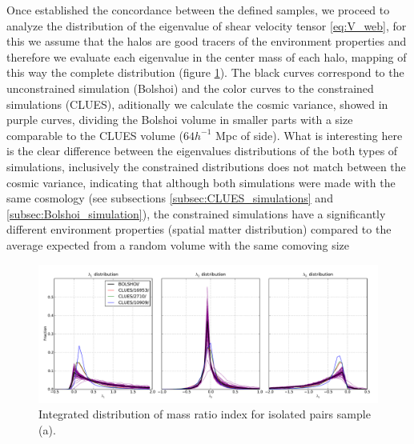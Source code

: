 \documentclass[usenatbib]{mn2e}
\begin{document}
Once established the concordance between the defined samples, we proceed to analyze the distribution 
of the eigenvalue of shear velocity tensor \ref{eq:V_web}, for this we assume that the halos are good 
tracers of the environment properties and therefore we evaluate each eigenvalue in the center mass of 
each halo, mapping of this way the complete distribution (figure \ref{fig:lambda_histogram}). The 
black curves correspond to the unconstrained simulation (Bolshoi) and the color curves to the 
constrained simulations (CLUES), aditionally we calculate the cosmic variance, showed in purple curves,
dividing the Bolshoi volume in smaller parts with a size comparable to the CLUES volume ($64 h^{-1 }$ Mpc of side).
What is interesting here is the clear difference between the eigenvalues distributions of the both 
types of simulations, inclusively the constrained distributions does not match between the cosmic 
variance, indicating that although both simulations were made with the same cosmology (see subsections 
\ref{subsec:CLUES_simulations} and \ref{subsec:Bolshoi_simulation}), the constrained simulations have
a significantly different environment properties (spatial matter distribution) compared to the average
expected from a random volume with the same comoving size

\begin{figure}
\begin{center}
\includegraphics[keepaspectratio=true,width=0.75\textheight]{./figures/All_Lambda_Histogram.pdf}
\caption{\small Integrated distribution of mass ratio index for isolated pairs sample (a).}
\label{fig:lambda_histogram}
\vspace{0.1 cm}
\end{center}
\end{figure}

\end{document}
